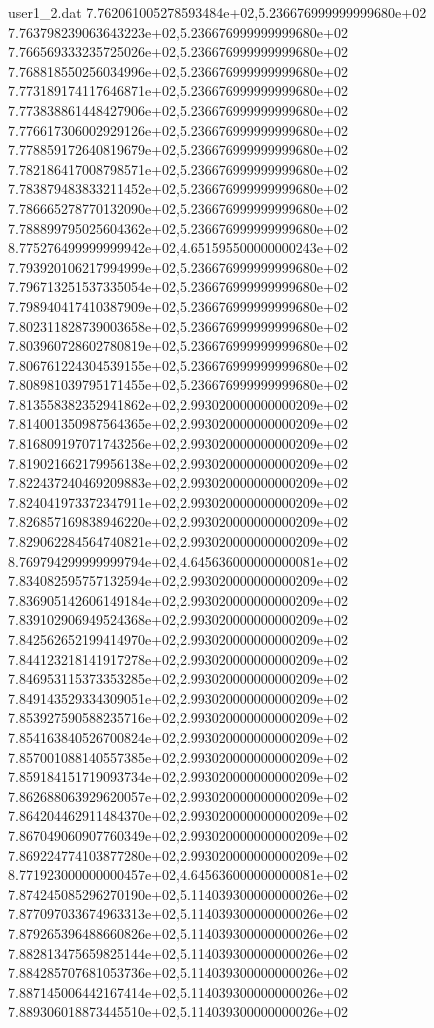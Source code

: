 \begin{filecontents}{user1_2.dat}
7.762061005278593484e+02,5.236676999999999680e+02
7.763798239063643223e+02,5.236676999999999680e+02
7.766569333235725026e+02,5.236676999999999680e+02
7.768818550256034996e+02,5.236676999999999680e+02
7.773189174117646871e+02,5.236676999999999680e+02
7.773838861448427906e+02,5.236676999999999680e+02
7.776617306002929126e+02,5.236676999999999680e+02
7.778859172640819679e+02,5.236676999999999680e+02
7.782186417008798571e+02,5.236676999999999680e+02
7.783879483833211452e+02,5.236676999999999680e+02
7.786665278770132090e+02,5.236676999999999680e+02
7.788899795025604362e+02,5.236676999999999680e+02
8.775276499999999942e+02,4.651595500000000243e+02
7.793920106217994999e+02,5.236676999999999680e+02
7.796713251537335054e+02,5.236676999999999680e+02
7.798940417410387909e+02,5.236676999999999680e+02
7.802311828739003658e+02,5.236676999999999680e+02
7.803960728602780819e+02,5.236676999999999680e+02
7.806761224304539155e+02,5.236676999999999680e+02
7.808981039795171455e+02,5.236676999999999680e+02
7.813558382352941862e+02,2.993020000000000209e+02
7.814001350987564365e+02,2.993020000000000209e+02
7.816809197071743256e+02,2.993020000000000209e+02
7.819021662179956138e+02,2.993020000000000209e+02
7.822437240469209883e+02,2.993020000000000209e+02
7.824041973372347911e+02,2.993020000000000209e+02
7.826857169838946220e+02,2.993020000000000209e+02
7.829062284564740821e+02,2.993020000000000209e+02
8.769794299999999794e+02,4.645636000000000081e+02
7.834082595757132594e+02,2.993020000000000209e+02
7.836905142606149184e+02,2.993020000000000209e+02
7.839102906949524368e+02,2.993020000000000209e+02
7.842562652199414970e+02,2.993020000000000209e+02
7.844123218141917278e+02,2.993020000000000209e+02
7.846953115373353285e+02,2.993020000000000209e+02
7.849143529334309051e+02,2.993020000000000209e+02
7.853927590588235716e+02,2.993020000000000209e+02
7.854163840526700824e+02,2.993020000000000209e+02
7.857001088140557385e+02,2.993020000000000209e+02
7.859184151719093734e+02,2.993020000000000209e+02
7.862688063929620057e+02,2.993020000000000209e+02
7.864204462911484370e+02,2.993020000000000209e+02
7.867049060907760349e+02,2.993020000000000209e+02
7.869224774103877280e+02,2.993020000000000209e+02
8.771923000000000457e+02,4.645636000000000081e+02
7.874245085296270190e+02,5.114039300000000026e+02
7.877097033674963313e+02,5.114039300000000026e+02
7.879265396488660826e+02,5.114039300000000026e+02
7.882813475659825144e+02,5.114039300000000026e+02
7.884285707681053736e+02,5.114039300000000026e+02
7.887145006442167414e+02,5.114039300000000026e+02
7.889306018873445510e+02,5.114039300000000026e+02

\end{filecontents}
